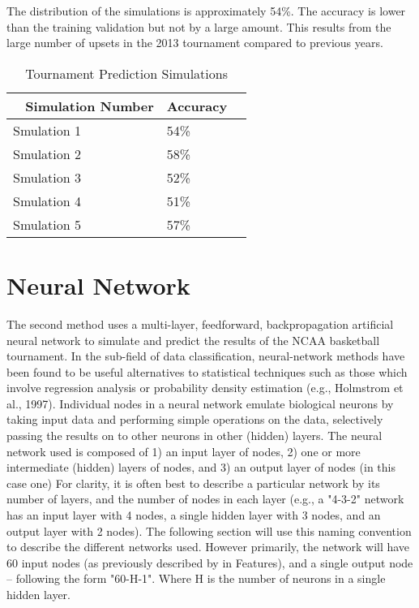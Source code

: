 \documentclass[conference]{IEEEtran}
\begin{document}
The distribution of the simulations is approximately 54\%. The accuracy is lower than the training validation but not by a large amount. This results from the large number of upsets in the 2013 tournament compared to previous years. 
 
\begin{table}[H]
	\centering
    \begin{tabular}{|l|l|l|}
    \hline
    ~   \textbf{Simulation Number}  & \textbf{Accuracy} \\ \hline
    Smulation 1 & 54\%  \\ \hline
    Smulation 2 & 58\% \\ \hline
    Smulation 3 & 52\% \\ \hline
    Smulation 4 & 51\% \\ \hline
    Smulation 5 & 57\%\\ \hline
    \end{tabular}
    \caption {Tournament Prediction Simulations}
    \label{tab:thetable}
\end{table}




\section{Neural Network}
The second method uses a multi-layer, feedforward, backpropagation artificial neural network to simulate and predict the results of the NCAA basketball tournament.
In the sub-field of data classification, neural-network methods have been found to be useful alternatives to statistical techniques such as those which involve regression analysis or probability density estimation (e.g., Holmstrom et al., 1997).
Individual nodes in a neural network emulate biological neurons by taking input data and performing simple operations on the data, selectively passing the results on to other neurons in other (hidden) layers.
The neural network used is composed of 1) an input layer of nodes, 2) one or more intermediate (hidden) layers of nodes, and 3) an output layer of nodes (in this case one)
For clarity, it is often best to describe a particular network by its number of layers, and the number of nodes in each layer (e.g., a "4-3-2" network has an input layer with 4 nodes, a single hidden layer with 3 nodes, and an output layer with 2 nodes).
The following section will use this naming convention to describe the different networks used.
However primarily, the network will have 60 input nodes (as previously described by in Features), and a single output node -- following the form "60-H-1".
Where H is the number of neurons in a single hidden layer.
\end{document}
